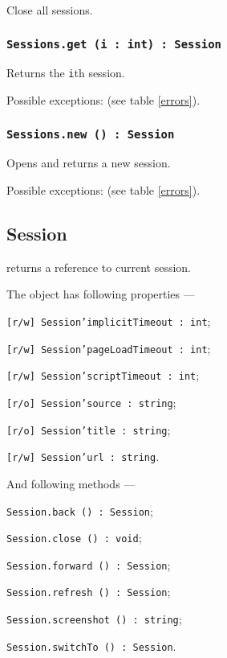 Close all sessions.

\subsubsection{\texttt{Sessions.get (i : int) : Session}}

Returns the \texttt{i}th session.

Possible exceptions:  (see table \ref{errors}).

\subsubsection{\texttt{Sessions.new () : Session}}

Opens and returns a new session.

Possible exceptions:  (see table \ref{errors}).

\subsection{{\color{orange} Session}}

\session{} returns a reference to current session.

The object \session{} has following properties —
\begin{icItems}
	\item \texttt{[r/w] Session'implicitTimeout : int};
	\item \texttt{[r/w] Session'pageLoadTimeout : int};
	\item \texttt{[r/w] Session'scriptTimeout : int};
	\item \texttt{[r/o] Session'source : string};
	\item \texttt{[r/o] Session'title : string};
	\item \texttt{[r/w] Session'url : string}.
\end{icItems}

And following methods —
\begin{icItems}
	\item \texttt{Session.back () : Session};
	\item \texttt{Session.close () : void};
	\item \texttt{Session.forward () : Session};
	\item \texttt{Session.refresh () : Session};
	\item \texttt{Session.screenshot () : string};
	\item \texttt{Session.switchTo () : Session}.
\end{icItems}

